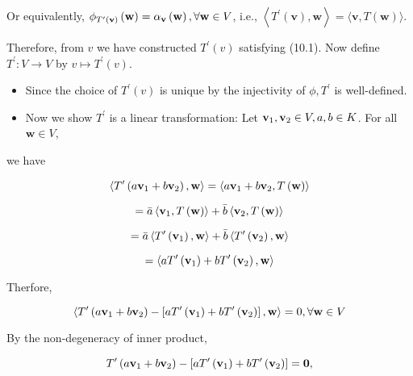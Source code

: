 \documentclass[11pt]{article}
\begin{document}
Or equivalently, \({\phi }_{{T}^{\prime }\left( \mathbf{v}\right) }\left( \mathbf{w}\right)  = \alpha_{\bf v}\left( \mathbf{w}\right) ,\forall \mathbf{w} \in  V\), i.e., \(\left\langle  {{T}^{\prime }\left( \mathbf{v}\right) ,\mathbf{w}}\right\rangle   = \langle \mathbf{v},T\left( \mathbf{w}\right) \rangle\).

Therefore, from \(v\) we have constructed \({T}^{\prime }\left( v\right)\) satisfying (10.1). Now define \({T}^{\prime } : V \rightarrow  V\) by \(v \mapsto  {T}^{\prime }\left( v\right)\).

\begin{itemize}
\item Since the choice of \({T}^{\prime }\left( v\right)\) is unique by the injectivity of \(\phi ,{T}^{\prime }\) is well-defined.
\end{itemize}

\begin{itemize}
\item Now we show \({T}^{\prime }\) is a linear transformation: Let \({\bf v}_1,{\bf v}_2 \in  V,a,b \in  K\). For all \(\mathbf{w} \in  V\),
\end{itemize}

we have

\[
\left\langle  {{T}^{\prime }\left( {a{\bf v}_1 + b{\bf v}_2}\right) ,\mathbf{w}}\right\rangle   = \left\langle  {a{\bf v}_1 + b{\bf v}_2,T\left( \mathbf{w}\right) }\right\rangle
\]

\[
= \bar{a}\left\langle  {{\bf v}_1,T\left( \mathbf{w}\right) }\right\rangle   + \bar{b}\left\langle  {{\bf v}_2,T\left( \mathbf{w}\right) }\right\rangle
\]

\[
= \bar{a}\left\langle  {{T}^{\prime }\left( {\bf v}_1\right) ,\mathbf{w}}\right\rangle   + \bar{b}\left\langle  {{T}^{\prime }\left( {\bf v}_2\right) ,\mathbf{w}}\right\rangle
\]

\[
= \left\langle  {a{T}^{\prime }\left( {\bf v}_1\right)  + b{T}^{\prime }\left( {\bf v}_2\right) ,\mathbf{w}}\right\rangle
\]

Therfore,

\[
\left\langle  {{T}^{\prime }\left( {a{\bf v}_1 + b{\bf v}_2}\right)  - \left\lbrack  {a{T}^{\prime }\left( {\bf v}_1\right)  + b{T}^{\prime }\left( {\bf v}_2\right) }\right\rbrack  ,\mathbf{w}}\right\rangle   = 0,\forall \mathbf{w} \in  V
\]

By the non-degeneracy of inner product,

\[
{T}^{\prime }\left( {a{\bf v}_1 + b{\bf v}_2}\right)  - \left\lbrack  {a{T}^{\prime }\left( {\bf v}_1\right)  + b{T}^{\prime }\left( {\bf v}_2\right) }\right\rbrack   = \mathbf{0},
\]
\end{document}
